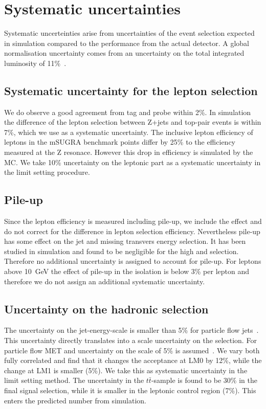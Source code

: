 \section{Systematic uncertainties}\label{sec:systematics}

Systematic uncerteinties arise from uncertainties of the event selection
expected in simulation compared to the performance from the actual detector.
A global normalisation uncertainty comes from an uncertainty on the total 
integrated luminosity of 11\%~\cite{lumiCMS}.

\subsection{Systematic uncertainty for the lepton selection}

We do observe a good agreement from tag and probe within 2\%.
In simulation the difference of the lepton
selection between Z+jets and top-pair events is within 7\%,
which we use as a systematic uncertainty.
The inclusive lepton efficiency of leptons in the mSUGRA
benchmark points differ by 25\% to the efficiency measured
at the Z resonace. 
However this drop in efficiency is simulated by the MC.
We take 10\% uncertainty on the leptonic part as a systematic uncertainty in the
limit setting procedure.

\subsection{Pile-up}

Since the lepton efficiency is measured including pile-up, we  include the effect
and do not correct for the difference in lepton selection efficiency.
Nevertheless pile-up has some effect on the jet and missing transvers energy 
selection. It has been studied in simulation and found to be negligible for the high \HT
and \MET selection.
Therefore no additional uncertainty is assigned to account for
pile-up.
For leptons above 10~GeV the effect of pile-up in the isolation is below 3\%
per lepton and therefore we do not assign an additional systematic uncertainty.

\subsection{Uncertainty on the hadronic selection}

The uncertainty on the jet-energy-scale is smaller than 5\% for
particle flow jets~\cite{jetMETUncertainty}. This uncertainty
directly translates into a scale uncertainty on the \HT selection.
For particle flow MET and uncertainty on the scale of 5\% is assumed~\cite{pfMETUNcertainty}.
We vary both fully correlated and find that it changes the acceptance
at LM0 by 12\%, while the change at LM1 is smaller (5\%).
We take this as systematic uncertainty in the limit setting method.
The uncertainty in the $t\bar{t}$-sample is found to be 30\%
in the final signal selection, while it is smaller in the leptonic control region (7\%). 
This enters the predicted number from simulation.

